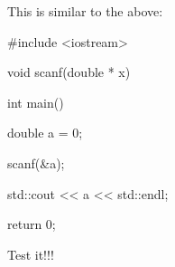 This is similar to the above:

\begin{consolethree}[escapeinside=||]

#include <iostream>



void scanf(double * x)

{

}



int main()

{

    double a = 0;

    scanf(&a);

    std::cout << a << std::endl;

    return 0;

}

\end{consolethree}

Test it!!!


